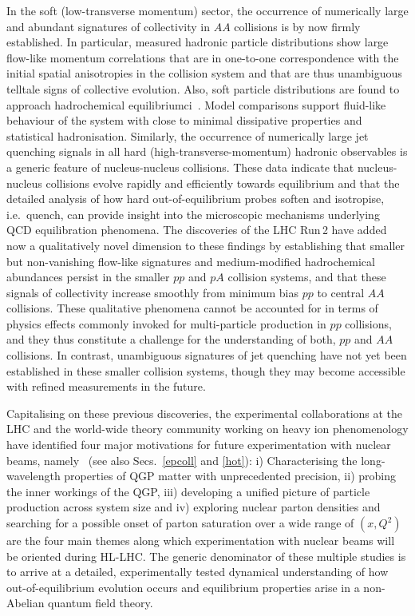 In the soft (low-transverse momentum) sector, the occurrence of numerically large and abundant signatures of collectivity in $AA$ collisions is by now firmly established. In particular,  measured hadronic particle distributions show large flow-like momentum correlations that are in one-to-one correspondence with the initial spatial anisotropies in the collision system and that are thus unambiguous telltale signs of collective evolution. Also, soft particle distributions are found to approach hadrochemical equilibriumci~\cite{Andronic:2017pug}. Model comparisons support fluid-like behaviour of the system with close to minimal dissipative properties and statistical hadronisation. Similarly, the occurrence of numerically large jet quenching signals in all hard (high-transverse-momentum) hadronic observables is a generic feature of nucleus-nucleus collisions. These data indicate that nucleus-nucleus collisions evolve rapidly and efficiently towards equilibrium and that the detailed analysis of how hard out-of-equilibrium probes soften and isotropise, i.e.\ quench, can provide insight into the microscopic mechanisms underlying QCD equilibration phenomena. The discoveries of the LHC Run\,2 have added now a qualitatively novel dimension to these findings by establishing that smaller but non-vanishing flow-like signatures and medium-modified hadrochemical abundances persist in the smaller $pp$ and $pA$ collision systems, and that these signals of collectivity increase smoothly from minimum bias $pp$ to central $AA$ collisions. These qualitative phenomena cannot be accounted for in terms of physics effects commonly invoked for multi-particle production in $pp$ collisions, and they thus constitute a challenge for the understanding of both, $pp$ and $AA$ collisions. In contrast, unambiguous signatures of jet quenching have not yet been established in these smaller collision systems, though they may become accessible with refined measurements in the future. 

Capitalising on these previous discoveries, the experimental collaborations at the LHC and the world-wide theory community working on heavy ion phenomenology have identified  four major motivations for future experimentation with nuclear beams, namely~\cite{Citron:2018lsq} (see also Secs.~\ref{epcoll} and \ref{hot}): i) Characterising the long-wavelength properties of QGP matter with unprecedented precision, ii) probing the inner workings of the QGP, iii) developing a unified picture of particle production across system size and iv) exploring nuclear parton densities and searching  for a possible onset of parton saturation over a wide range of $(x,Q^2)$ are the four main themes along which experimentation with nuclear beams will be oriented  during HL-LHC. The generic denominator of these multiple studies is to arrive at a detailed, experimentally tested dynamical understanding of how out-of-equilibrium evolution occurs and equilibrium properties arise in a non-Abelian quantum field theory. 
\vfill

